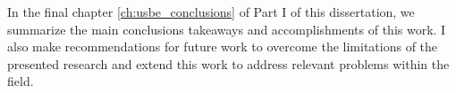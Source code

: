 In the final chapter \ref{ch:usbe_conclusions} of Part I of this dissertation, we summarize
the main conclusions takeaways and accomplishments of this work. I
also make recommendations for future work to overcome the limitations
of the presented research and extend this work to address relevant
problems within the field.

